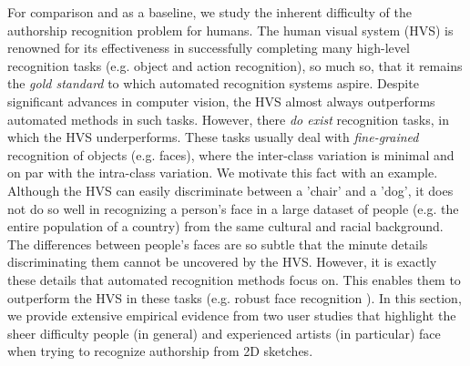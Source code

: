 For comparison and as a baseline, we study the inherent difficulty of the authorship recognition problem for humans. The human visual system (HVS) is renowned for its effectiveness in successfully completing many high-level recognition tasks (e.g. object and action recognition), so much so, that it remains the \emph{gold standard} to which automated recognition systems aspire. Despite significant advances in computer vision, the HVS almost always outperforms automated methods in such tasks. However, there \emph{do exist} recognition tasks, in which the HVS underperforms. These tasks usually deal with \emph{fine-grained} recognition of objects (e.g. faces), where the inter-class variation is minimal and on par with the intra-class variation. We motivate this fact with an example. Although the HVS can easily discriminate between a 'chair' and a 'dog', it does not do so well in recognizing a person's face in a large dataset of people (e.g. the entire population of a country) from the same cultural and racial background. The differences between people's faces are so subtle that the minute details discriminating them cannot be uncovered by the HVS. However, it is exactly these details that automated recognition methods focus on. This enables them to outperform the HVS in these tasks (e.g. robust face recognition \cite{4483511}). In this section, we provide extensive empirical evidence from two user studies that highlight the sheer difficulty people (in general) and experienced artists (in particular) face when trying to recognize authorship from 2D sketches.%




